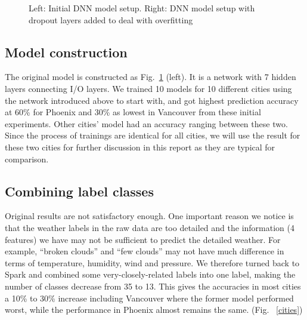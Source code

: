 \documentclass[runningheads]{llncs}
\begin{document}
\begin{figure}
    \caption{Left: Initial DNN model setup. Right: DNN model setup with dropout layers added to deal with overfitting}\label{model}
\end{figure}

\subsection{Model construction}

The original model is constructed as Fig.~\ref{model} (left). It is a network with 7 hidden layers connecting I/O layers. We trained 10 models for 10 different cities using the network introduced above to start with, and got highest prediction accuracy at 60\% for Phoenix and 30\% as lowest in Vancouver from these initial experiments. Other cities' model had an accuracy ranging between these two. Since the process of trainings are identical for all cities, we will use the result for these two cities for further discussion in this report as they are typical for comparison.


\subsection{Combining label classes}
Original results are not satisfactory enough. One important reason we notice is that the weather labels in the raw data are too detailed and the information (4 features) we have may not be sufficient to predict the detailed weather. For example, ``broken clouds'' and ``few clouds'' may not have much difference in terms of temperature, humidity, wind and pressure. We therefore turned back to Spark and combined some very-closely-related labels into one label, making the number of classes decrease from 35 to 13. This gives the accuracies in most cities a 10\% to 30\% increase including Vancouver where the former model performed worst, while the performance in Phoenix almost remains the same. (Fig. ~\ref{cities})
\end{document}

